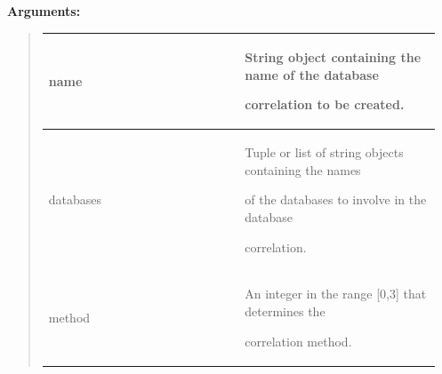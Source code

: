 \documentclass[letterpaper,10pt,english]{sphinxmanual}
\begin{document}
\begin{DUlineblock}{0em}
\item[] 
\item[] \textbf{Arguments:}
\end{DUlineblock}
\begin{quote}

\begin{tabular}{|p{0.475\linewidth}|p{0.475\linewidth}|}
\hline

name
 & 
\begin{DUlineblock}{0em}
\item[] String object containing the name of the database
\item[] correlation to be created.
\end{DUlineblock}
\\
\hline
databases
 & 
\begin{DUlineblock}{0em}
\item[] Tuple or list of string objects containing the names
\item[] of the databases to involve in the database
\item[] correlation.
\end{DUlineblock}
\\
\hline
method
 & 
\begin{DUlineblock}{0em}
\item[] An integer in the range {[}0,3{]} that determines the
\item[] correlation method.
\end{DUlineblock}
\\
\hline\end{tabular}

\end{quote}
\end{document}
